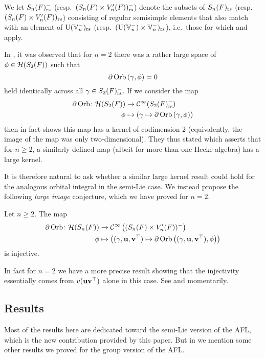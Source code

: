 We let $S_n(F)_{\mathrm{rs}}^-$ (resp.\ $(S_n(F) \times V'_n(F))_{\mathrm{rs}}^-$)
denote the subsets of $S_n(F)_{\mathrm{rs}}$ (resp.\ $(S_n(F) \times V'_n(F))_{\mathrm{rs}}$)
consisting of regular semisimple elements that also match with an element of
$\operatorname{U}(\mathbb V_n^-)_{\mathrm{rs}}$ (resp.\ $(\operatorname{U}(\mathbb V_n^-) \times \mathbb V_n^-)_{\mathrm{rs}}$),
i.e.\ those for which 
and  apply.

In \cite{ref:AFLspherical}, it was observed that for $n = 2$
there was a rather large space of $\phi \in \mathcal H(S_2(F))$ such that
\[ \partial \operatorname{Orb} \left(\gamma, \phi \right) = 0 \]
held identically across all $\gamma \in S_2(F)_{\mathrm{rs}}^-$.
If we consider the map
\begin{align*}
  \partial\operatorname{Orb} \colon \mathcal H(S_2(F)) &\to \mathcal{C}^\infty(S_2(F)_{\mathrm{rs}}^-) \\
  \phi &\mapsto \left( \gamma \mapsto \partial \operatorname{Orb} \left(\gamma, \phi \right) \right)
\end{align*}
then \cite[Theorem 8.2.3]{ref:AFLspherical} in fact
shows this map has a kernel of codimension $2$
(equivalently, the image of the map was only two-dimensional).
They thus stated \cite[Conjecture 1.0.2]{ref:AFLspherical} which asserts that for $n \ge 2$,
a similarly defined map (albeit for more than one Hecke algebra) has a large kernel.

It is therefore natural to ask whether a similar large kernel result
could hold for the analogous orbital integral in the semi-Lie case.
We instead propose the following \emph{large image} conjecture,
which we have proved for $n = 2$.
\begin{conjecture}
  \label{conj:kernel_semi_lie}
  Let $n \ge 2$.
  The map
  \begin{align*}
    \partial\operatorname{Orb} \colon \mathcal H(S_n(F)) &\to \mathcal{C}^\infty\left( (S_n(F) \times V'_n(F))^- \right) \\
    \phi &\mapsto \left( {(\gamma, \mathbf u, \mathbf v^\top)} \mapsto \partial \operatorname{Orb} \left({(\gamma, \mathbf u, \mathbf v^\top)}, \phi \right) \right)
  \end{align*}
  is injective.
\end{conjecture}
In fact for $n=2$ we have a more precise result
showing that the injectivity essentially comes from $v(\mathbf u\mathbf v^\top)$ alone in this case.
See  and  momentarily.

\subsection{Results}
\ifthesis
Most of the results here are dedicated toward the semi-Lie version of the AFL,
which is the new contribution provided by this paper.
But in  we mention some other results
we proved for the group version of the AFL.
\fi

